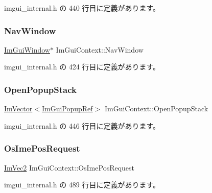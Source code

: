 imgui\+\_\+internal.\+h の 440 行目に定義があります。

\mbox{\label{struct_im_gui_context_ae06077e45c894488b28baaf2d7ff8e41}} 
\subsubsection{\texorpdfstring{Nav\+Window}{NavWindow}}
{\footnotesize\ttfamily \mbox{\hyperlink{struct_im_gui_window}{Im\+Gui\+Window}}$\ast$ Im\+Gui\+Context\+::\+Nav\+Window}



 imgui\+\_\+internal.\+h の 424 行目に定義があります。

\mbox{\label{struct_im_gui_context_af6c0e07cff9641d31bdf22b7e7df2842}} 
\subsubsection{\texorpdfstring{Open\+Popup\+Stack}{OpenPopupStack}}
{\footnotesize\ttfamily \mbox{\hyperlink{class_im_vector}{Im\+Vector}}$<$\mbox{\hyperlink{struct_im_gui_popup_ref}{Im\+Gui\+Popup\+Ref}}$>$ Im\+Gui\+Context\+::\+Open\+Popup\+Stack}



 imgui\+\_\+internal.\+h の 446 行目に定義があります。

\mbox{\label{struct_im_gui_context_af98a8f8b9c96bf8b692449daedf45602}} 
\subsubsection{\texorpdfstring{Os\+Ime\+Pos\+Request}{OsImePosRequest}}
{\footnotesize\ttfamily \mbox{\hyperlink{struct_im_vec2}{Im\+Vec2}} Im\+Gui\+Context\+::\+Os\+Ime\+Pos\+Request}



 imgui\+\_\+internal.\+h の 489 行目に定義があります。

